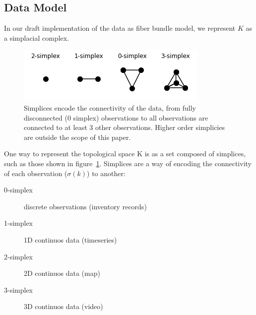 \documentclass[../main.tex]{subfiles}
\begin{document}
\subsection{Data Model}
In our draft implementation of the data as fiber bundle model, we represent $K$ as a simplacial complex. 

\begin{figure}[ht]
    \label{fig:simplex}
    \includegraphics{figures/sections/math/simplex.png}
    \caption{Simplices encode the connectivity of the data, from fully disconnected (0 simplex) observations to all observations are connected to at least 3 other observations. Higher order simplicies are outside the scope of this paper.}
\end{figure}

One way to represent the topological space K is as a set composed of simplices, such as those shown in figure~\ref{fig:simplex}. Simplices are a way of encoding the connectivity of each observation ($\sigma(k)$) to another: %

\begin{description}
    \item[0-simplex] discrete observations (inventory records)
    \item[1-simplex] 1D continuos data (timeseries)
    \item[2-simplex] 2D continuos data (map)
    \item[3-simplex] 3D continuos data (video)
\end{description}
\end{document}
